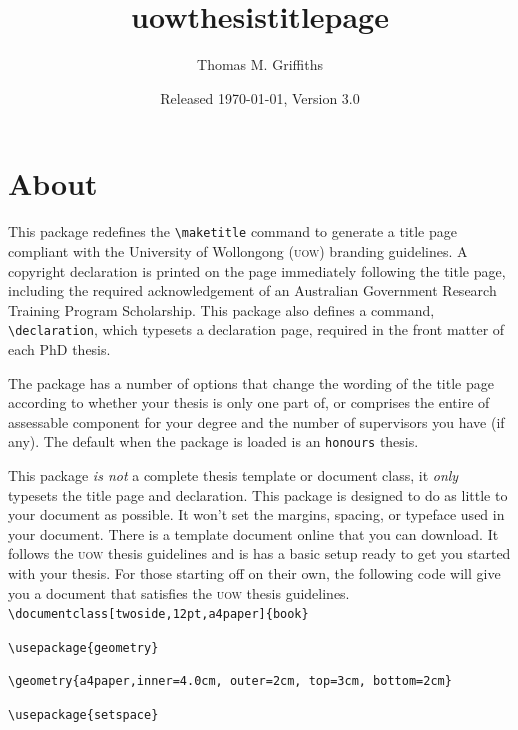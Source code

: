 \documentclass[12pt,oneside]{article}
\newcommand{\option}[1]{\texttt{\color{UOWblue}#1}}
\newcommand{\command}[1]{\texttt{\color{UOWred}#1}}
\newcommand{\comoptions}[1]{\texttt{\color{UOWdarkblue}#1}}
\begin{document}
    
\title{\textsf{uowthesistitlepage}}
\author{\small Thomas M. Griffiths}
\date{Released \today, Version 3.0}

\maketitle

\tableofcontents

\section{About}
This package redefines the \command{\textbackslash{}maketitle} command to generate a title page compliant with the University of Wollongong (\textsc{uow}) branding guidelines. A copyright declaration is printed on the page immediately following the title page, including the required acknowledgement of an Australian Government Research Training Program Scholarship. This package also defines a command, \command{\textbackslash{}declaration}, which typesets a declaration page, required in the front matter of each PhD thesis. 

The package has a number of options that change the wording of the title page according to whether your thesis is only one part of, or comprises the entire of assessable component for your degree and the number of supervisors you have (if any). The default when the package is loaded is an \option{honours} thesis.

This package \emph{is not} a complete thesis template or document class, it \emph{only} typesets the title page and declaration. This package is designed to do as little to your document as possible. It won't set the margins, spacing, or typeface used in your document. There is a template document online that you can download. It follows the \textsc{uow} thesis guidelines and is has a basic setup ready to get you started with your thesis. For those starting off on their own, the following code will give you a document that satisfies the \textsc{uow} thesis guidelines.\\

\command{\textbackslash{}documentclass}\option{[twoside,12pt,a4paper]}\comoptions{\{book\}}

\command{\textbackslash{}usepackage}\comoptions{\{geometry\}}

\command{\textbackslash{}geometry}\comoptions{\{a4paper,inner=4.0cm, outer=2cm, top=3cm, bottom=2cm\}}

\command{\textbackslash{}usepackage}\comoptions{\{setspace\}}
\end{document}
